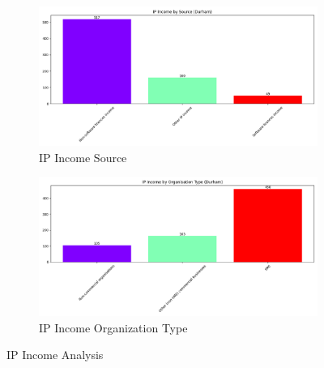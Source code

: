 \documentclass[journal,onecolumn, 10pt,draftclsnofoot]{IEEEtran}
\begin{document}
\begin{figure}[h]
    \centering
    \begin{subfigure}[b]{0.48\textwidth}
        \centering
        \includegraphics[width=\linewidth]{Fig/figure24.ip_income_source.png}
        \caption{IP Income Source}
        \label{fig:ip-income-source}
    \end{subfigure}
    \hfill
    \begin{subfigure}[b]{0.48\textwidth}
        \centering
        \includegraphics[width=\linewidth]{Fig/figure25.ip_income_org_type.png}
        \caption{IP Income Organization Type}
        \label{fig:ip-income-org-type}
    \end{subfigure}
    \vspace{0.6cm}
    \caption{IP Income Analysis}
    \label{fig:ip-income-analysis}
\end{figure}
\end{document}
